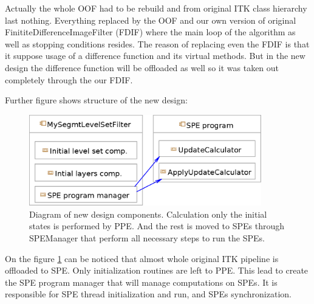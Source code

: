 \par
Actually the whole OOF had to be rebuild and from original ITK class hierarchy last nothing.
Everything replaced by the OOF and our own version of original FinititeDifferenceImageFilter (FDIF) where the main loop of the algorithm as well as stopping conditions resides.
The reason of replacing even the FDIF is that it suppose usage of a difference function and its virtual methods.
But in the new design the difference function will be offloaded as well so it was taken out completely through the our FDIF.

Further figure shows structure of the new design:

\begin{figure}
    \centering
    \includegraphics[width=0.9\textwidth]{data/newDesign}
    \caption[Diagram of new design components]
{
Diagram of new design components. Calculation only the initial states is performed by PPE.
And the rest is moved to SPEs through SPEManager that perform all necessary steps to run the SPEs.
}
\label{fg:newDesign}
\end{figure}

On the figure \ref{fg:newDesign} can be noticed that almost whole original ITK pipeline is offloaded to SPE.
Only initialization routines are left to PPE. This lead to create the SPE program manager that will manage computations on SPEs.
It is responsible for SPE thread initialization and run, and SPEs synchronization.

